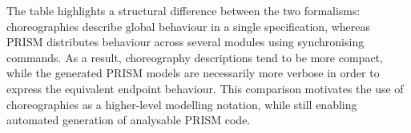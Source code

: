 The table highlights a structural difference between the two formalisms: 
choreographies describe global behaviour in a single specification, whereas PRISM distributes
behaviour across several modules using synchronising commands. As a result, choreography
descriptions tend to be more compact, while the generated PRISM models are necessarily more
verbose in order to express the equivalent endpoint behaviour. This comparison motivates the
use of choreographies as a higher-level modelling notation, while still enabling automated
generation of analysable PRISM code.


